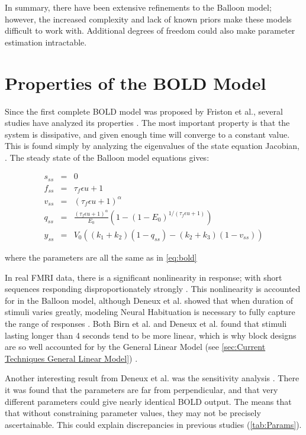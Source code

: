In summary, there have been extensive refinements to the Balloon
model; however, the increased complexity and lack of known priors 
make these models difficult to work with. Additional degrees of freedom 
could also make parameter estimation intractable.

\section{Properties of the BOLD Model}
\label{sec:BOLD Analysis}
Since the first complete BOLD model was proposed by Friston et al.,  
several studies have analyzed its properties \cite{Friston2002}.  
The most important property is that the system is dissipative, and given
enough time will converge to a constant value. This is found simply by
analyzing the eigenvalues of the state equation Jacobian, 
\cite{Deneux2006, Hu2009}. The steady state of the Balloon
model equations gives:

\begin{eqnarray}
s_{ss} &=& 0 \nonumber \\
f_{ss} &=& \tau_f\epsilon u + 1\nonumber \\
v_{ss} &=& (\tau_f\epsilon u + 1)^\alpha\nonumber \\
q_{ss} &=& \frac{(\tau_f\epsilon u + 1)^\alpha}{E_0}(1-(1-E_0)^{1/(\tau_f\epsilon u + 1)})\nonumber \\
y_{ss} &=& V_0((k_1+k_2)(1-q_{ss}) - (k_2+k_3)(1-v_{ss}))
\label{eq:steadystate}
\end{eqnarray}

where the parameters are all the same as in \autoref{eq:bold}

In real FMRI data, there is a significant nonlinearity in response; with short sequences
responding disproportionately strongly \cite{Birn2001, Wager2005, Deneux2006}.
This nonlinearity is accounted for in the Balloon model, although Deneux et al.
showed that when duration of stimuli varies greatly,
modeling Neural Habituation is necessary to fully capture the range of responses \cite{Deneux2006}. 
Both Birn et al. and Deneux et al. found that 
stimuli lasting longer than 4 seconds 
tend to be more linear, which is why block designs are so well accounted for
by the General Linear Model (see \autoref{sec:Current Techniques General Linear Model})
\cite{Birn2001, Deneux2006}.

Another interesting result from Deneux et al. was the sensitivity analysis \cite{Deneux2006}.
There it was found that the parameters are far from perpendicular,
and that very different parameters could give nearly identical BOLD output.
The means that that without constraining parameter values, they may not be 
precisely ascertainable. This could explain discrepancies in previous studies
(\autoref{tab:Params}).

